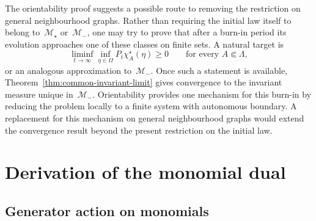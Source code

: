\documentclass[EJP,preprint,NODS,nobera]{ejpecp}
\begin{document}
The orientability proof suggests a possible route to removing the restriction
on general neighbourhood graphs. Rather than requiring the initial law itself
to belong to~$\mathcal M_\star$ or~$\mathcal M_-$, one may try to prove
that after a burn-in period its evolution approaches one of these classes on
finite sets. A natural target is
\begin{equation*}
\liminf_{t\to\infty}
\inf_{\eta\in\Omega}
P_t\chi_A^\star(\eta)
\geq0
\qquad
\text{for every }A\Subset\Lambda,
\end{equation*}
or an analogous approximation to~$\mathcal M_-$. Once such a statement is
available, Theorem~\ref{thm:common-invariant-limit} gives convergence to the invariant measure unique in~$\mathcal{M}_-$. Orientability provides one mechanism for this
burn-in by reducing the problem locally to a finite system with autonomous
boundary. A replacement for this mechanism on general neighbourhood
graphs would extend the convergence result beyond the present restriction on
the initial law.

\appendix

\section{Derivation of the monomial dual}
\label{app:dual-calculation}

\subsection{Generator action on monomials}
\label{app:generator-action}
\end{document}
